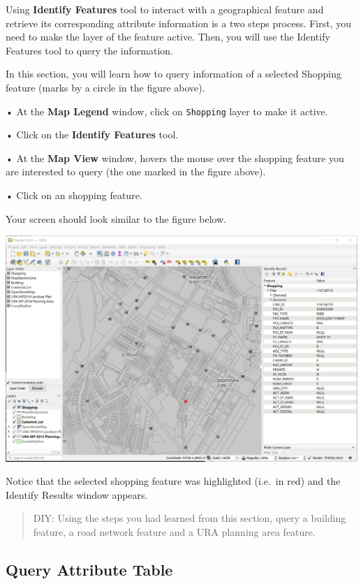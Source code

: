 \documentclass[
  letterpaper,
  DIV=11,
  numbers=noendperiod]{scrreprt}
\begin{document}
Using \textbf{Identify Features} tool to interact with a geographical
feature and retrieve its corresponding attribute information is a two
steps process. First, you need to make the layer of the feature active.
Then, you will use the Identify Features tool to query the information.

In this section, you will learn how to query information of a selected
Shopping feature (marks by a circle in the figure above).

• At the \textbf{Map Legend} window, click on \texttt{Shopping} layer to
make it active.

• Click on the \textbf{Identify Features} tool.

• At the \textbf{Map View} window, hovers the mouse over the shopping
feature you are interested to query (the one marked in the figure
above).

• Click on an shopping feature.

Your screen should look similar to the figure below.

\includegraphics{./img/image1-21.jpg}

Notice that the selected shopping feature was highlighted (i.e.~in red)
and the Identify Results window appears.

\begin{quote}
DIY: Using the steps you had learned from this section, query a building
feature, a road network feature and a URA planning area feature.
\end{quote}

\hypertarget{query-attribute-table}{%
\subsection{Query Attribute Table}\label{query-attribute-table}}
\end{document}
